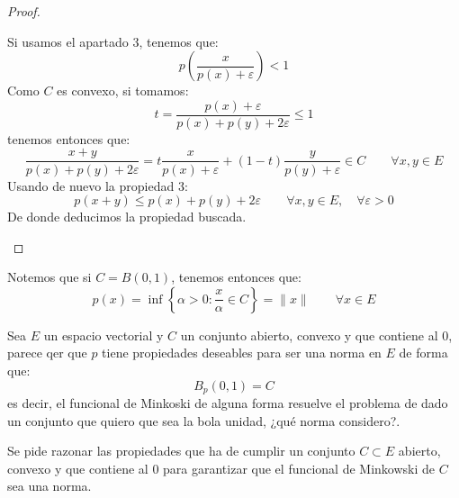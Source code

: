\begin{prop}
\begin{proof}
\begin{enumerate}
\begin{equation*}
                \end{equation*}
                Si usamos el apartado 3, tenemos que:
                \begin{equation*}
                    p\left(\dfrac{x}{p(x)+\varepsilon}\right) < 1
                \end{equation*}
                Como $C$ es convexo, si tomamos:
                \begin{equation*}
                    t = \dfrac{p(x)+\varepsilon}{p(x)+p(y)+2\varepsilon} \leq 1
                \end{equation*}
                tenemos entonces que:
                \begin{equation*}
                    \dfrac{x+y}{p(x) + p(y) + 2\varepsilon} = t\dfrac{x}{p(x)+\varepsilon} + (1-t)\dfrac{y}{p(y)+\varepsilon}\in C\qquad \forall x,y\in E
                \end{equation*}
                Usando de nuevo la propiedad 3:
                \begin{equation*}
                    p(x+y) \leq p(x) + p(y) + 2\varepsilon \qquad \forall x,y\in E, \quad \forall \varepsilon>0
                \end{equation*}
                De donde deducimos la propiedad buscada.\qedhere
        \end{enumerate}
    \end{proof}
\end{prop}

\begin{observacion}
    Notemos que si $C = B(0,1)$, tenemos entonces que:
    \begin{equation*}
        p(x) = \inf\left\{\alpha> 0 : \dfrac{x}{\alpha}\in C\right\} = \|x\| \qquad \forall x\in E
    \end{equation*}
\end{observacion}

\begin{ejercicio} %
    Sea $E$ un espacio vectorial y $C$ un conjunto abierto, convexo y que contiene al $0$, parece qer que $p$ tiene propiedades deseables para ser una norma en $E$ de forma que:
    \begin{equation*}
        B_p(0,1) = C
    \end{equation*}
    es decir, el funcional de Minkoski de alguna forma resuelve el problema de dado un conjunto que quiero que sea la bola unidad, ¿qué norma considero?.

    Se pide razonar las propiedades que ha de cumplir un conjunto $C\subset E$ abierto, convexo y que contiene al $0$ para garantizar que el funcional de Minkowski de $C$ sea una norma.
\end{ejercicio}


